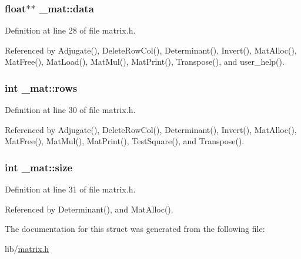 \subsubsection[{\texorpdfstring{data}{data}}]{\setlength{\rightskip}{0pt plus 5cm}float$\ast$$\ast$ \+\_\+mat\+::data}\hypertarget{struct__mat_a00dcd82a8de11b7f16f7edfde55bcfae}{}\label{struct__mat_a00dcd82a8de11b7f16f7edfde55bcfae}


Definition at line 28 of file matrix.\+h.



Referenced by Adjugate(), Delete\+Row\+Col(), Determinant(), Invert(), Mat\+Alloc(), Mat\+Free(), Mat\+Load(), Mat\+Mul(), Mat\+Print(), Transpose(), and user\+\_\+help().

\subsubsection[{\texorpdfstring{rows}{rows}}]{\setlength{\rightskip}{0pt plus 5cm}int \+\_\+mat\+::rows}\hypertarget{struct__mat_a5e6bcb8b0c0239ca9b782c48b0b3c98a}{}\label{struct__mat_a5e6bcb8b0c0239ca9b782c48b0b3c98a}


Definition at line 30 of file matrix.\+h.



Referenced by Adjugate(), Delete\+Row\+Col(), Determinant(), Invert(), Mat\+Alloc(), Mat\+Free(), Mat\+Mul(), Mat\+Print(), Test\+Square(), and Transpose().

\subsubsection[{\texorpdfstring{size}{size}}]{\setlength{\rightskip}{0pt plus 5cm}int \+\_\+mat\+::size}\hypertarget{struct__mat_ab54203ad7b60fc23832cb3b2a863857f}{}\label{struct__mat_ab54203ad7b60fc23832cb3b2a863857f}


Definition at line 31 of file matrix.\+h.



Referenced by Determinant(), and Mat\+Alloc().



The documentation for this struct was generated from the following file\+:\begin{DoxyCompactItemize}
\item 
lib/\hyperlink{matrix_8h}{matrix.\+h}\end{DoxyCompactItemize}
